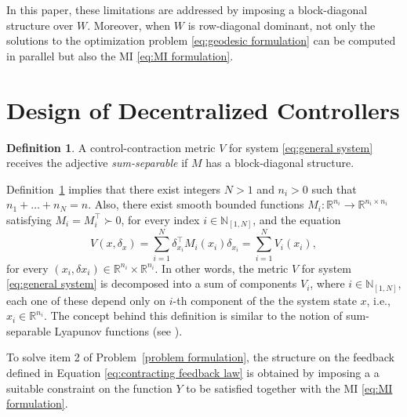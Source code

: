 \documentclass[10pt,twocolumn,twoside]{IEEEtran}
\theoremstyle{plain}
\theoremstyle{definition}
\newtheorem{definition}[theorem]{Definition}
\theoremstyle{remark}
\begin{document}
In this paper, these limitations are addressed by imposing a block-diagonal structure over $W$. Moreover, when $W$ is row-diagonal dominant, not only the solutions to the optimization problem \eqref{eq:geodesic formulation} can be computed in parallel but also the MI \eqref{eq:MI formulation}.

\section{Design of Decentralized Controllers}\label{sec:Design of Decentralized Controllers}

\begin{definition}\label{def:SSCCM}
	A control-contraction metric $V$ for system \eqref{eq:general system} receives the adjective \emph{sum-separable} if $M$ has a block-diagonal structure. 
\end{definition}

Definition~\ref{def:SSCCM} implies that there exist integers $N>1$ and $n_i>0$ such that $n_1+\ldots+n_N=n$. Also, there exist smooth bounded functions $M_i:\mathbb{R}^{n_i}\to\mathbb{R}^{n_i\times n_i}$ satisfying $M_i=M_i^\top\succ0$, for every index $i\in\mathbb{N}_{[1,N]}$, and the equation
	\begin{equation*}
		V(x,\delta_x)=\sum_{i=1}^N \delta_{x_i}^\top M_i(x_i)\delta_{x_i}=\sum_{i=1}^N V_i(x_i),
	\end{equation*}
for every $(x_i,\delta x_i)\in\mathbb{R}^{n_i}\times\mathbb{R}^{n_i}$. In other words, the metric $V$ for system \eqref{eq:general system} is decomposed into a sum of components $V_i$, where $i\in\mathbb{N}_{[1,N]}$, each one of these depend only on $i$-th component of the the system state $x$, i.e., $x_i\in\mathbb{R}^{n_i}$. The concept behind this definition is similar to the notion of sum-separable Lyapunov functions (see \cite{Dirr2015}). 

To solve item 2 of Problem~\ref{problem formulation}, the structure on the feedback defined in Equation \eqref{eq:contracting feedback law} is obtained by imposing a a suitable constraint on the function $Y$ to be satisfied together with the MI \eqref{eq:MI formulation}. 
\end{document}
